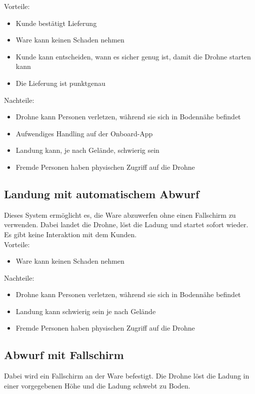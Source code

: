 Vorteile:
\begin{itemize}
	\item Kunde bestätigt Lieferung
	\item Ware kann keinen Schaden nehmen
	\item Kunde kann entscheiden, wann es sicher genug ist, damit die Drohne starten kann
	\item Die Lieferung ist punktgenau
\end{itemize}


Nachteile:
\begin{itemize}
	\item Drohne kann Personen verletzen, während sie sich in Bodennähe befindet
	\item Aufwendiges Handling auf der Onboard-App
	\item Landung kann, je nach Gelände, schwierig sein
	\item Fremde Personen haben physischen Zugriff auf die Drohne
\end{itemize}

\subsection{Landung mit automatischem Abwurf}

Dieses System ermöglicht es, die Ware abzuwerfen ohne einen Fallschirm zu verwenden. Dabei landet die Drohne, löst die Ladung und startet sofort wieder. Es gibt keine Interaktion mit dem Kunden.\\
Vorteile:
\begin{itemize}
	\item Ware kann keinen Schaden nehmen
\end{itemize}


Nachteile:
\begin{itemize}
	\item Drohne kann Personen verletzen, während sie sich in Bodennähe befindet
	\item Landung kann schwierig sein je nach Gelände
	\item Fremde Personen haben physischen Zugriff auf die Drohne
\end{itemize}


\subsection{Abwurf mit Fallschirm}

Dabei wird ein Fallschirm an der Ware befestigt. Die Drohne löst die Ladung in einer vorgegebenen Höhe und die Ladung schwebt zu Boden.\\

